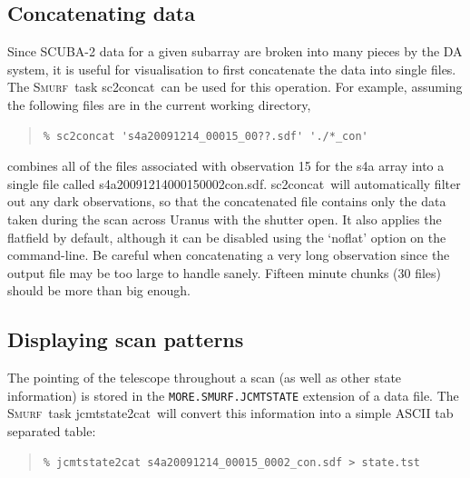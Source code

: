 \documentclass[twoside,11pt]{article}
\newcommand{\xref}[3]{#1}
\newcommand{\xlabel}[1]{}
\renewcommand{\_}{\texttt{\symbol{95}}}
\newenvironment{myquote}{\begin{quote}\begin{small}}{\end{small}\end{quote}}
\newcommand{\smurf}{\xref{\textsc{Smurf}}{sun258}{}}
\newcommand{\task}[1]{\textsf{#1}}
\newcommand{\concat}{\xref{\task{sc2concat}}{sun258}{SC2CONCAT}}
\newcommand{\jcmtstate}{\xref{\task{jcmtstate2cat}}{sun258}{JCMTSTATE2CAT}}
\begin{document}
\subsection{\xlabel{concat}Concatenating data}

Since SCUBA-2 data for a given subarray are broken into many pieces by
the DA system, it is useful for visualisation to first concatenate the
data into single files. The \smurf\ task \concat\ can be used for this
operation. For example, assuming the following files are in the
current working directory,

\begin{myquote}
\begin{verbatim}
% sc2concat 's4a20091214_00015_00??.sdf' './*_con'
\end{verbatim}
\end{myquote}

combines all of the files associated with observation 15 for the s4a
array into a single file called
s4a20091214\_00015\_0002\_con.sdf. \concat\ will automatically filter
out any dark observations, so that the concatenated file contains only
the data taken during the scan across Uranus with the shutter open. It
also applies the flatfield by default, although it can be disabled using
the `noflat' option on the command-line. Be careful when concatenating
a very long observation since the output file may be too large to
handle sanely. Fifteen minute chunks (30 files) should be more than
big enough.

\subsection{\xlabel{display_scan}Displaying scan patterns}
\label{sec:state}

The pointing of the telescope throughout a scan (as well as other
state information) is stored in the \texttt{MORE.SMURF.JCMTSTATE}
extension of a data file. The \smurf\ task \jcmtstate\ will convert
this information into a simple ASCII tab separated table:

\begin{myquote}
\begin{verbatim}
% jcmtstate2cat s4a20091214_00015_0002_con.sdf > state.tst
\end{verbatim}
\end{myquote}
\end{document}
